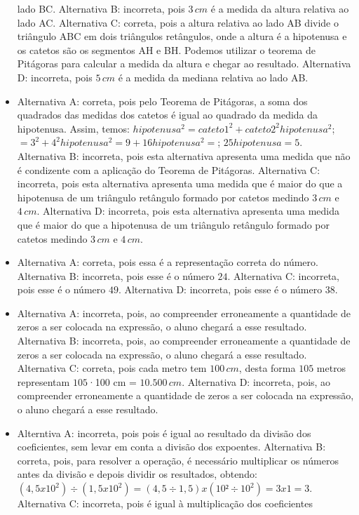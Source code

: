 \begin{itemize}
lado BC.
Alternativa B: incorreta, pois $3\,cm$ é a medida da altura relativa ao
lado AC.
Alternativa C: correta, pois a altura relativa ao lado AB divide o
triângulo ABC em dois triângulos retângulos, onde a altura é a
hipotenusa e os catetos são os segmentos AH e BH. Podemos utilizar o
teorema de Pitágoras para calcular a medida da altura e chegar ao
resultado.
Alternativa D: incorreta, pois $5\,cm$ é a medida da mediana relativa ao
lado AB.
\item Alternativa A: correta, pois pelo Teorema de Pitágoras, a soma dos
quadrados das medidas dos catetos é igual ao quadrado da medida da
hipotenusa. Assim, temos: $hipotenusa^2 = cateto1^2 + cateto2^2 hipotenusa^2$; $= 3^2 + 4^2 hipotenusa^2 = 9 + 16 hipotenusa^2 =$; $25 hipotenusa = 5$.
Alternativa B: incorreta, pois esta alternativa apresenta uma medida que
não é condizente com a aplicação do Teorema de Pitágoras.
Alternativa C: incorreta, pois esta alternativa apresenta uma medida que
é maior do que a hipotenusa de um triângulo retângulo formado por
catetos medindo $3\,cm$ e $4\,cm$.
Alternativa D: incorreta, pois esta alternativa apresenta uma medida que
é maior do que a hipotenusa de um triângulo retângulo formado por
catetos medindo $3\,cm$ e $4\,cm$.
\item Alternativa A: correta, pois essa é a representação correta do número.
Alternativa B: incorreta, pois esse é o número $24$.
Alternativa C: incorreta, pois esse é o número $49$.
Alternativa D: incorreta, pois esse é o número $38$.
\item 
Alternativa A: incorreta, pois, ao compreender erroneamente a quantidade
de zeros a ser colocada na expressão, o aluno chegará a esse resultado.
Alternativa B: incorreta, pois, ao compreender erroneamente a quantidade
de zeros a ser colocada na expressão, o aluno chegará a esse resultado.
Alternativa C: correta, pois cada metro tem $100\,cm$, desta forma $105$
metros representam $105$·100 cm = $10.500\,cm$.
Alternativa D: incorreta, pois, ao compreender erroneamente a quantidade
de zeros a ser colocada na expressão, o aluno chegará a esse resultado.
\item Alterntiva A: incorreta, pois pois é igual ao resultado da divisão dos
coeficientes, sem levar em conta a divisão dos expoentes.
Alternativa B: correta, pois, para resolver a operação, é necessário
multiplicar os números antes da divisão e depois dividir os resultados,
obtendo: $(4,5 x 10^2) ÷ (1,5 x 10^2) = (4,5 ÷ 1,5) x (10² ÷ 10^2) = 3 x 1 = 3$.
Alternativa C: incorreta, pois é igual à multiplicação dos coeficientes

\end{itemize}
